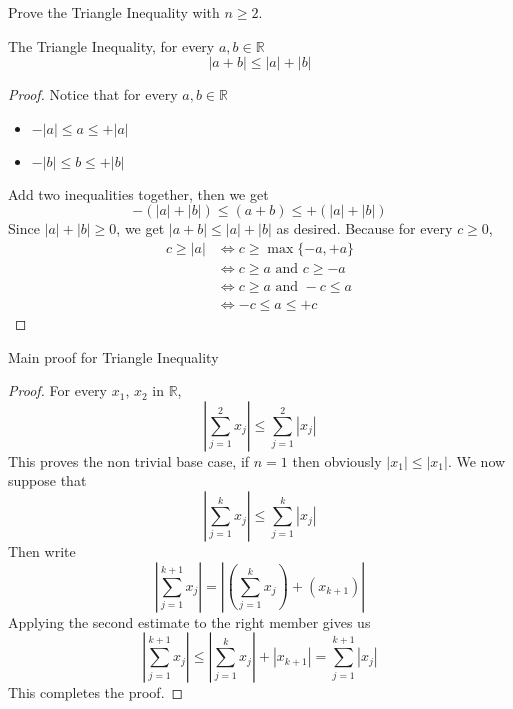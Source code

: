 \documentclass[../../main.tex]{subfiles}
\begin{document}
\begin{wts}
    Prove the Triangle Inequality with $n\geq 2$.
\end{wts}
\newcommand{\sumn}[1]{\sum_{j=1}^{#1}}
\begin{lemma}
    The Triangle Inequality, for every $a, b\in\mathbb{R}$
    \[
    |a+b|\leq |a| + |b|
    \]
\end{lemma}
\begin{proof}
    Notice that for every $a,b \in \mathbb{R}$
    \begin{itemize}
        \item $-|a|\leq a\leq +|a|$
        \item $-|b|\leq b\leq +|b|$
    \end{itemize}
    Add two inequalities together, then we get
    \[
    -\left(|a| + |b|\right)\leq (a + b) \leq +\left(|a| + |b|\right)
    \]
    Since $|a| + |b|\geq 0$, we get $|a+b|\leq |a| + |b|$ as desired. Because for every $c\geq 0$,
    \begin{align*}
        c\geq |a|&\iff c\geq\max{\{-a, +a\}}\\
        &\iff c\geq a\text{ and }c\geq -a\\
        &\iff c\geq a\text{ and }-c\leq a\\
        &\iff -c\leq a\leq +c
    \end{align*}
\end{proof}
Main proof for Triangle Inequality
\begin{proof}
    For every $x_1$, $x_2$ in $\mathbb{R}$,
    \[
    \left|\sumn{2} x_j\right|\leq \sumn{2}\left|x_j\right|
    \]
    This proves the non trivial base case, if $n=1$ then obviously $|x_1|\leq |x_1|$. We now suppose that
    \[
    \left|\sumn{k} x_j\right|\leq \sumn{k}\left|x_j\right|
    \]
    Then write
    \[
    \left|\sumn{k+1} x_j\right| = \left|\left(\sumn{k} x_j\right) + (x_{k+1})\right| 
    \]
    Applying the second estimate to the right member gives us
    \[
    \left|\sumn{k+1} x_j\right|\leq \left|\sumn{k} x_j\right| + \left|x_{k+1}\right|= \sumn{k+1}\left|x_j\right|
    \]
    This completes the proof.
\end{proof}
\end{document}
